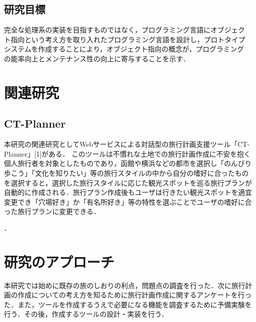 \documentclass{funthesis}
\begin{document}
\section{研究目標}

完全な処理系の実装を目指すものではなく，プログラミング言語にオブジェク
ト指向という考え方を取り入れたプログラミング言語を設計し，プロトタイプ
システムを作成することにより，オブジェクト指向の概念が，プログラミング
の能率向上とメンテナンス性の向上に寄与することを示す．

\chapter{関連研究}%

\section{CT-Planner}


本研究の関連研究としてWebサービスによる対話型の旅行計画支援ツール「CT-Planner」[1]がある．
このツールは不慣れな土地での旅行計画作成に不安を抱く個人旅行者を対象としたものであり，函館や横浜などの都市を選択し「のんびり歩こう」「文化を知りたい」等の旅行スタイルの中から自分の嗜好に合ったものを選択すると，選択した旅行スタイルに応じた観光スポットを巡る旅行プランが自動的に作成される．旅行プラン作成後もユーザは行きたい観光スポットを適宜変更でき「穴場好き」か「有名所好き」等の特性を選ぶことでユーザの嗜好に合った旅行プランに変更できる．


．


\chapter{研究のアプローチ}%

本研究では始めに既存の旅のしおりの利点，問題点の調査を行った．次に旅行計画の作成についての考え方を知るために旅行計画作成に関するアンケートを行った．また，ツールを作成するうえで必要になる機能を調査するために予備実験を行う．その後，作成するツールの設計・実装を行う．
\end{document}
